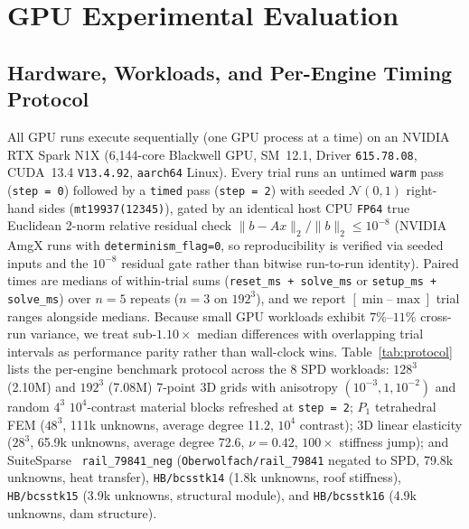\documentclass[10pt]{article}
\begin{document}
\section{GPU Experimental Evaluation}\label{sec:eval}

\subsection{Hardware, Workloads, and Per-Engine Timing Protocol}
All GPU runs execute sequentially (one GPU process at a time) on an NVIDIA RTX Spark N1X (6,144-core Blackwell GPU, SM~12.1, Driver \texttt{615.78.08}, CUDA~13.4 \texttt{V13.4.92}, \texttt{aarch64} Linux). Every trial runs an untimed \texttt{warm} pass (\texttt{step = 0}) followed by a \texttt{timed} pass (\texttt{step = 2}) with seeded $\mathcal{N}(0,1)$ right-hand sides (\texttt{mt19937(12345)}), gated by an identical host CPU \texttt{FP64} true Euclidean 2-norm relative residual check $\|b - A x\|_2 / \|b\|_2 \le 10^{-8}$ (NVIDIA AmgX runs with \texttt{determinism\_flag=0}, so reproducibility is verified via seeded inputs and the $10^{-8}$ residual gate rather than bitwise run-to-run identity). Paired times are medians of within-trial sums (\texttt{reset\_ms + solve\_ms} or \texttt{setup\_ms + solve\_ms}) over $n = 5$ repeats ($n = 3$ on $192^3$), and we report $[\min\text{--}\max]$ trial ranges alongside medians. Because small GPU workloads exhibit $7\%$--$11\%$ cross-run variance, we treat sub-$1.10\times$ median differences with overlapping trial intervals as performance parity rather than wall-clock wins. Table~\ref{tab:protocol} lists the per-engine benchmark protocol across the 8 SPD workloads: $128^3$ (2.10M) and $192^3$ (7.08M) 7-point 3D grids with anisotropy $(10^{-3}, 1, 10^{-2})$ and random $4^3$ $10^4$-contrast material blocks refreshed at \texttt{step = 2}; $P_1$ tetrahedral FEM ($48^3$, 111k unknowns, average degree 11.2, $10^4$ contrast); 3D linear elasticity ($28^3$, 65.9k unknowns, average degree 72.6, $\nu = 0.42$, $100\times$ stiffness jump); and SuiteSparse~\cite{davis2011suitesparse} \texttt{rail\_79841\_neg} (\texttt{Oberwolfach/rail\_79841} negated to SPD, 79.8k unknowns, heat transfer), \texttt{HB/bcsstk14} (1.8k unknowns, roof stiffness), \texttt{HB/bcsstk15} (3.9k unknowns, structural module), and \texttt{HB/bcsstk16} (4.9k unknowns, dam structure).
\end{document}
